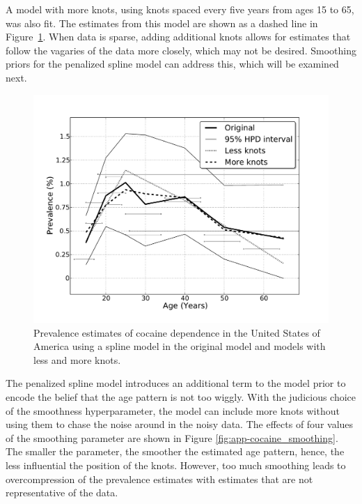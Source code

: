 A model with more knots, using knots spaced every five years from
ages 15 to 65, was also fit.
The estimates from this model are shown as a dashed line in
Figure~\ref{fig:app-cocaine_knots}.  When data is sparse, adding
additional knots allows for estimates that follow the vagaries of the
data more closely, which may not be desired.  Smoothing priors for the
penalized spline model can address this, which will be examined next.

    \begin{figure}[h]
        \begin{center}
            \includegraphics[width=\textwidth]{applications/cocaine_dependence-knots.pdf}
            \caption{Prevalence estimates of cocaine dependence in the United
              States of America using a spline model in the original
              model and models with less and more knots. }
        \label{fig:app-cocaine_knots}
        \end{center}
    \end{figure}

The penalized spline model introduces an additional term to the model
prior to encode the belief that the age pattern is not too wiggly.
With the judicious choice of the smoothness hyperparameter, the model
can include more knots without using them to chase the noise around in
the noisy data.  The effects of four values of the smoothing parameter
are shown in Figure \ref{fig:app-cocaine_smoothing}.  The smaller the
parameter, the smoother the estimated age pattern, hence, the less
influential the position of the knots.  However, too much smoothing
leads to overcompression of the prevalence estimates with estimates
that are not representative of the data.

